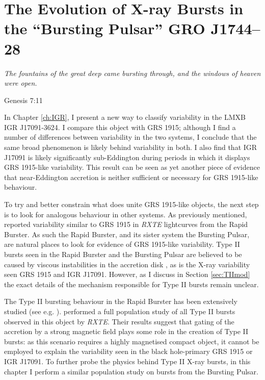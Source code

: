 
\chapter{The Evolution of X-ray Bursts in the ``Bursting Pulsar'' GRO J1744--28}

\label{ch:BPbig}

\epigraph{\textit{The fountains of the great deep came bursting through, and the windows of heaven were open.}}{Genesis 7:11}
\vspace{1cm}

\par\noindent In Chapter \ref{ch:IGR}, I present a new way to classify variability in the LMXB IGR J17091-3624.  I compare this object with GRS 1915; although I find a number of differences between variability in the two systems, I conclude that the same broad phenomenon is likely behind variability in both.  I also find that IGR J17091 is likely significantly sub-Eddington during periods in which it displays GRS 1915-like variability.  This result can be seen as yet another piece of evidence that near-Eddington accretion is neither sufficient or necessary for GRS 1915-like behaviour.
\par To try and better constrain what does unite GRS 1915-like objects, the next step is to look for analogous behaviour in other systems.  As previously mentioned, \citet{Bagnoli_RB} reported variability similar to GRS 1915 in \textit{RXTE} lightcurves from the Rapid Burster.  As such the Rapid Burster, and its sister system the Bursting Pulsar, are natural places to look for evidence of GRS 1915-like variability.  Type II bursts seen in the Rapid Burster and the Bursting Pulsar are believed to be caused by viscous instabilities in the accretion disk \citep{Lewin_TypeII}, as is the X-ray variability seen GRS 1915 and IGR J17091.  However, as I discuss in Section \ref{sec:TIImod} the exact details of the mechanism responsible for Type II bursts remain unclear.
\par The Type II bursting behaviour in the Rapid Burster has been extensively studied (see e.g. \citealp{Lewin_TypeII,Hoffman_RB}).  \citet{Bagnoli_PopStudy} performed a full population study of all Type II bursts observed in this object by \textit{RXTE}.  Their results suggest that gating of the accretion by a strong magnetic field plays some role in the creation of Type II bursts: as this scenario requires a highly magnetised compact object, it cannot be employed to explain the variability seen in the black hole-primary GRS 1915 or IGR J17091.  To further probe the physics behind Type II X-ray bursts, in this chapter I perform a similar population study on bursts from the Bursting Pulsar.
